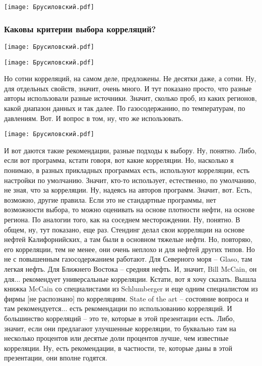 \documentclass[main.tex]{subfiles}
\begin{document}
\begin{center}
\texttt{[image: Брусиловский.pdf]}
\end{center}



\subsubsection{Каковы критерии выбора корреляций?}

\begin{center}
\texttt{[image: Брусиловский.pdf]}
\end{center}



\begin{center}
\texttt{[image: Брусиловский.pdf]}
\end{center}

Но сотни корреляций, на самом деле, предложены.
Не десятки даже, а сотни.
Ну, для отдельных свойств, значит, очень много.
И тут показано просто, что разные авторы использовали разные источники.
Значит, сколько проб, из каких регионов, какой диапазон данных и так далее.
По газосодержанию, по температурам, по давлениям.
Вот.
И вопрос в том, ну, что же использовать.

\begin{center}
\texttt{[image: Брусиловский.pdf]}
\end{center}

И вот даются такие рекомендации, разные подходы к выбору.
Ну, понятно.
Либо, если вот программа, кстати говоря, вот какие корреляции.
Но, насколько я понимаю, в разных прикладных программах есть, используют корреляции, есть настройки по умолчанию.
Значит, кто-то использует, естественно, по умолчанию, не зная, что за корреляции.
Ну, надеясь на авторов программ.
Значит, вот.
Есть, возможно, другие правила.
Если это не стандартные программы, нет возможности выбора, то можно оценивать на основе плотности нефти, на основе региона.
По аналогии того, как на соседнем месторождении.
Ну, понятно.
В общем, ну, тут показано, еще раз.
Стендинг делал свои корреляции на основе нефтей Калифорнийских, а там были в основном тяжелые нефти.
Но, повторяю, его корреляции, тем не менее, они очень неплохо и для нефтей других типов.
Но не с повышенным газосодержанием работают.
Для Северного моря -- Glaso, там легкая нефть.
Для Ближнего Востока – средняя нефть.
И, значит, Bill McCain, он для... рекомендует универсальные корреляции.
Кстати, вот я хочу сказать.
Вышла книжка McCain со специалистами из Schlumberger и еще одним специалистом из фирмы [не распознано] по корреляциям.
State of the art -- состояние вопроса и там рекомендуется... есть рекомендации по использованию корреляций.
И большинство корреляций -- это те, которые в этой презентации есть.
Либо, значит, если они предлагают улучшенные корреляции, то буквально там на несколько процентов или десятые доли процентов лучше, чем известные корреляции.
Ну, есть рекомендации, в частности, те, которые даны в этой презентации, они вполне годятся.
\end{document}
